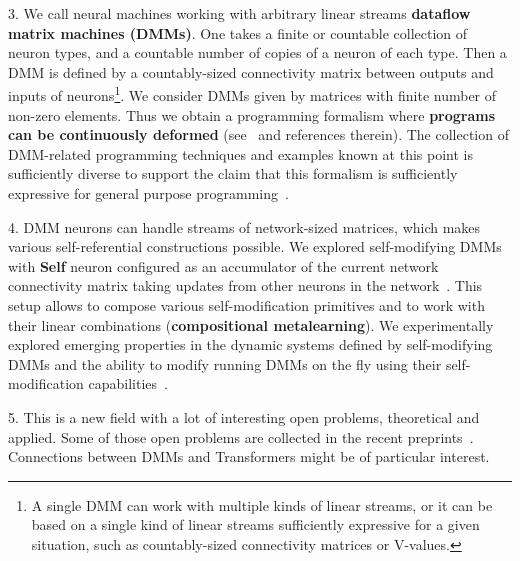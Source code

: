 \documentclass{article}
\begin{document}
3. We call neural machines working with arbitrary linear streams {\bf dataflow matrix machines (DMMs)}. One takes a finite or countable collection of neuron types, and a countable number of copies of a neuron of each type. Then a DMM is defined by
a countably-sized connectivity matrix between outputs and inputs of neurons\footnote{A single DMM can work with multiple kinds of linear streams, or it can be based on a
single kind of linear streams sufficiently expressive for a given situation, such as countably-sized connectivity matrices or
V-values.}. We consider DMMs given by matrices with finite number of non-zero elements. Thus we obtain a programming
formalism where {\bf programs can be continuously deformed} (see~\cite{BukatinAnthony} and references therein). The collection
of DMM-related programming techniques and examples known at this point is sufficiently diverse to support the claim that
this formalism is sufficiently expressive for general purpose programming~\cite{BukatinOverview}. 

4. DMM neurons can handle streams of network-sized matrices, which makes various self-referential constructions possible.
We explored self-modifying DMMs with {\bf Self} neuron configured as an accumulator of the current network connectivity matrix taking updates from other neurons in the network~\cite{BukatinAnthony}. This setup allows to compose various
self-modification primitives and to work with their linear combinations ({\bf compositional metalearning}). We
experimentally explored emerging properties in the dynamic systems defined by self-modifying DMMs and
the ability to modify running DMMs on the fly using their self-modification capabilities~\cite{DMM2018}.

5. This is a new field with a lot of interesting open problems,  theoretical and applied. Some of those open problems
are collected in the recent preprints~\cite{BukatinAug2020, BukatinJan2020}. Connections between DMMs and Transformers might be of particular interest.

\small
\end{document}
